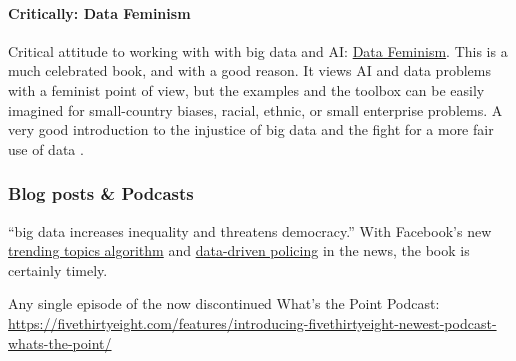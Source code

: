 \documentclass[
  fontsize=13pt,
  english,
  a4paper,
  openany, a4paper, oneside]{article}
\begin{document}
\hypertarget{critically-data-feminism}{%
\paragraph{Critically: Data Feminism}\label{critically-data-feminism}}

Critical attitude to working with with big data and AI: \href{https://mitpressonpubpub.mitpress.mit.edu/data-feminism}{Data Feminism}. This is a much celebrated book, and with a good reason. It views AI and data problems with a feminist point of view, but the examples and the toolbox can be easily imagined for small-country biases, racial, ethnic, or small enterprise problems. A very good introduction to the injustice of big data and the fight for a more fair use of data \citep{data_feminism}.

\hypertarget{blogposts}{%
\subsubsection{Blog posts \& Podcasts}\label{blogposts}}

``big data increases inequality and threatens democracy.'' With Facebook's new \href{http://qz.com/769413/heres-how-facebooks-automated-trending-bar-probably-works/}{trending topics algorithm} and \href{https://medium.com/equal-future/predictive-policing-is-happening-now-and-police-could-learn-a-real-lesson-from-minority-report-e105a592eda0\#.h90q9xoqx}{data-driven policing} in the news, the book is certainly timely.

Any single episode of the now discontinued What's the Point Podcast: \url{https://fivethirtyeight.com/features/introducing-fivethirtyeight-newest-podcast-whats-the-point/}
\end{document}
